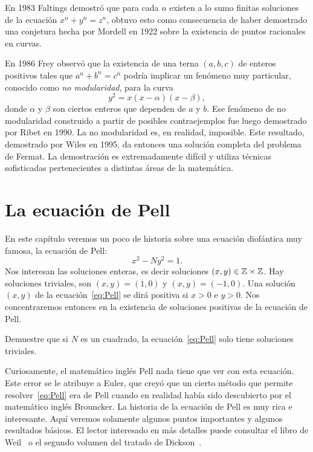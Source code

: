 En 1983 Faltings demostró que para cada $n$ existen a lo
sumo finitas soluciones de la ecuación $x^n+y^n=z^n$, obtuvo esto como
consecuencia de haber demostrado una conjetura hecha por Mordell en 1922 sobre
la existencia de puntos racionales en curvas. 

En 1986 Frey observó que la
existencia de una terna $(a,b,c)$ de enteros positivos tales que $a^n+b^n=c^n$
podría implicar un fenómeno muy particular, conocido como \emph{no
modularidad}, para la curva
\[
	y^2=x(x-\alpha)(x-\beta),
\]
donde $\alpha$ y $\beta$ son ciertos enteros que dependen de $a$ y $b$. 
Ese fenómeno de no modularidad construido a partir de posibles
contraejemplos fue luego demostrado por Ribet en 1990. La no modularidad es, en
realidad, imposible. Este resultado, demostrado por Wiles en 1995, da 
entonces una solución completa del problema de Fermat.
La demostración es extremadamente difícil y utiliza
técnicas sofisticadas pertenecientes a distintas áreas de la matemática.  

\section*{La ecuación de Pell}

En este capítulo veremos un poco de historia sobre una ecuación diofántica muy
famosa, la ecuación de Pell:
\begin{equation}
	\label{eq:Pell}
	x^2-Ny^2=1.
\end{equation}
Nos interesan las soluciones enteras, es decir soluciones $(x,y)\in\mathbb{Z}\times\mathbb{Z}$.
Hay soluciones triviales, son $(x,y)=(1,0)$ y $(x,y)=(-1,0)$. Una solución
$(x,y)$ de la ecuación~\eqref{eq:Pell} se dirá positiva si $x>0$ e $y>0$. Nos
concentraremos entonces en la existencia de soluciones positivas de la ecuación
de Pell.

\begin{exercise}
	Demuestre que si $N$ es un cuadrado, la ecuación~\eqref{eq:Pell} solo
	tiene soluciones triviales.
\end{exercise}

Curiosamente, el matemático inglés Pell nada tiene que ver con esta ecuación.
Este error se le atribuye a Euler, que creyó que un cierto método que permite
resolver~\eqref{eq:Pell} era de Pell cuando en realidad había sido descubierto
por el matemático inglés Brouncker.  La historia de la ecuación de Pell es muy
rica e interesante. Aquí veremos solamente algunos puntos importantes y algunos
resultados básicos. El lector interesado en más detalles puede consultar el
libro de Weil~\cite{MR734177} o el segundo volumen del tratado de
Dickson~\cite{MR0245500}.

